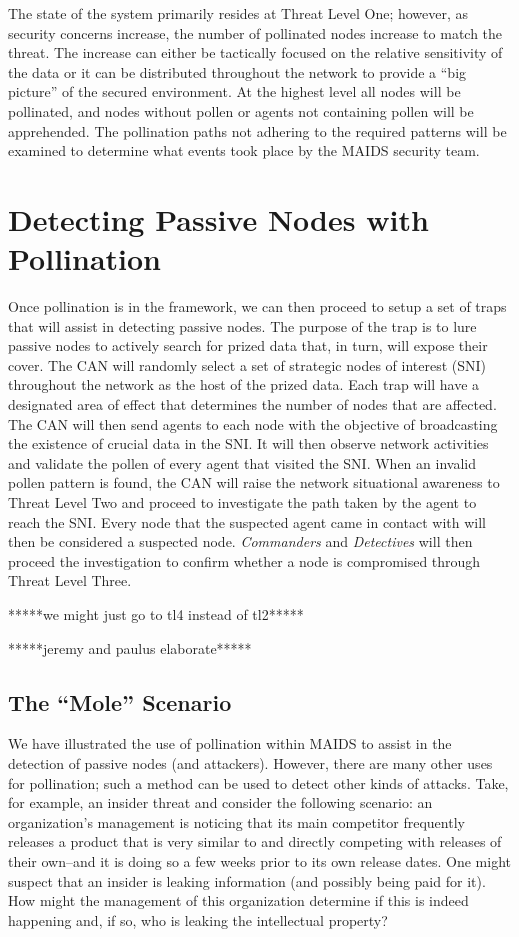 \documentclass{acm_proc_article-sp}
\begin{document}
The state of the system primarily resides at Threat Level One; however, as security concerns increase, the number of pollinated nodes increase to match the threat.  The increase can either be tactically focused on the relative sensitivity of the data or it can be distributed throughout the network to provide a ``big picture'' of the secured environment.  At the highest level all nodes will be pollinated, and nodes without pollen or agents not containing pollen will be apprehended.  The pollination paths not adhering to the required patterns will be examined to determine what events took place by the MAIDS security team.

\section{Detecting Passive Nodes with\\Pollination}
Once pollination is in the framework, we can then proceed to setup a set of traps that will assist in detecting passive nodes.  The purpose of the trap is to lure passive nodes to actively search for prized data that, in turn, will expose their cover.  The CAN will randomly select a set of strategic nodes of interest (SNI) throughout the network as the host of the prized data.  Each trap will have a designated area of effect that determines the number of nodes that are affected.  The CAN will then send agents to each node with the objective of broadcasting the existence of crucial data in the SNI.  It will then observe network activities and validate the pollen of every agent that visited the SNI.  When an invalid pollen pattern is found, the CAN will raise the network situational awareness to Threat Level Two and proceed to investigate the path taken by the agent to reach the SNI.  Every node that the suspected agent came in contact with will then be considered a suspected node.  {\it Commanders} and {\it Detectives} will then proceed the investigation to confirm whether a node is compromised through Threat Level Three.

*****we might just go to tl4 instead of tl2*****

*****jeremy and paulus elaborate*****

\subsection{The ``Mole'' Scenario}
We have illustrated the use of pollination within MAIDS to assist in the detection of passive nodes (and attackers).  However, there are many other uses for pollination; such a method can be used to detect other kinds of attacks.  Take, for example, an insider threat and consider the following scenario: an organization's management is noticing that its main competitor frequently releases a product that is very similar to and directly competing with releases of their own--and it is doing so a few weeks prior to its own release dates.  One might suspect that an insider is leaking information (and possibly being paid for it).  How might the management of this organization determine if this is indeed happening and, if so, who is leaking the intellectual property?
\end{document}
